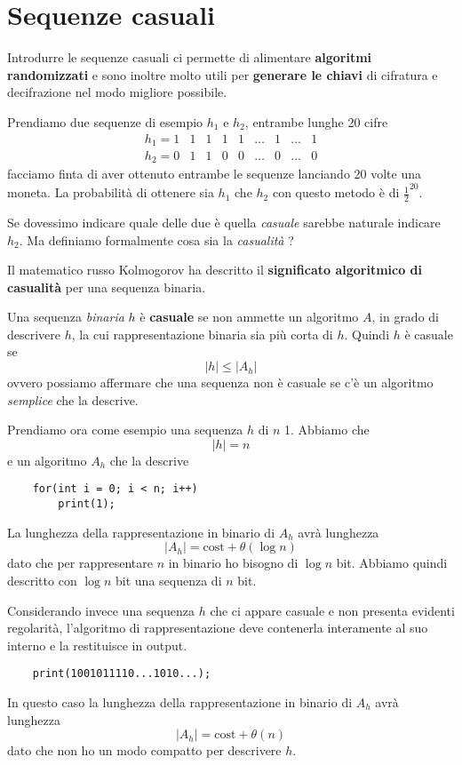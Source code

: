 \chapter{Sequenze casuali}
Introdurre le sequenze casuali ci permette di alimentare \textbf{algoritmi randomizzati} e sono inoltre molto utili
per \textbf{generare le chiavi} di cifratura e decifrazione nel modo migliore possibile.

Prendiamo due sequenze di esempio $h_1$ e $h_2$, entrambe lunghe 20 cifre
\[
	\begin{matrix}
		h_1 = 1 & 1 & 1 & 1 & 1 & \dots & 1 & \dots & 1 \\
		h_2 = 0 & 1 & 1 & 0 & 0 & \dots & 0 & \dots & 0
	\end{matrix}
\]
facciamo finta di aver ottenuto entrambe le sequenze lanciando 20 volte una moneta. La probabilit\`a di ottenere sia
$h_1$ che $h_2$ con questo metodo \`e di $\frac{1}{2}^{20}$.

Se dovessimo indicare quale delle due \`e quella \emph{casuale} sarebbe naturale indicare $h_2$. Ma definiamo formalmente
cosa sia la \emph{casualit\`a} ?

Il matematico russo Kolmogorov ha descritto il \textbf{significato algoritmico di casualit\`a} per una sequenza binaria.

\begin{definition}[Kolmogorov]
	Una sequenza \emph{binaria} $h$ \`e \textbf{casuale} se non ammette un algoritmo $A$, in grado di descrivere $h$, la
	cui rappresentazione binaria sia pi\`u corta di $h$. Quindi $h$ \`e casuale se
	\[ |h| \leq |A_h| \]
	ovvero possiamo affermare che una sequenza non \`e casuale se c'\`e un algoritmo \emph{semplice} che la descrive.
\end{definition}

\begin{example}
	Prendiamo ora come esempio una sequenza $h$ di $n$ 1. Abbiamo che
	\[ |h| = n \]
	e un algoritmo $A_h$ che la descrive
	\begin{lstlisting}
	for(int i = 0; i < n; i++)
		print(1);
	\end{lstlisting}
	La lunghezza della rappresentazione in binario di $A_h$ avr\`a lunghezza
	\[ |A_h| = \text{cost} + \theta(\log n) \]
	dato che per rappresentare $n$ in binario ho bisogno di $\log n$ bit. Abbiamo quindi descritto con $\log n$	bit
	una sequenza di $n$ bit.
\end{example}

\begin{example}
	Considerando invece una sequenza $h$ che ci appare casuale e non presenta evidenti regolarit\`a, l'algoritmo di
	rappresentazione deve contenerla interamente al suo interno e la restituisce in output.
	\begin{lstlisting}
	print(1001011110...1010...);
	\end{lstlisting}
	In questo caso la lunghezza della rappresentazione in binario di $A_h$ avr\`a lunghezza
	\[ |A_h| = \text{cost} + \theta(n) \]
	dato che non ho un modo compatto per descrivere $h$.
\end{example}

